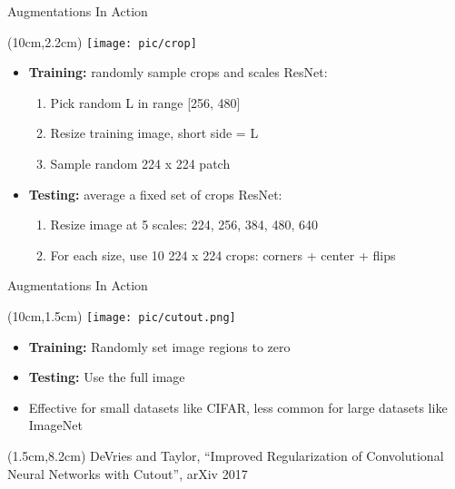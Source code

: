 \documentclass[serif, aspectratio=169]{beamer}
\begin{document}
\begin{frame}{Augmentations In Action}
	\begin{textblock*}{5cm}(10cm,2.2cm) %
		\texttt{[image: pic/crop]}
	\end{textblock*}

	\begin{itemize}
	\item \textbf{Training:} randomly sample crops and scales \newline ResNet:
		\begin{enumerate}
				\item Pick random L in range [256, 480]
				\item Resize training image, short side = L
				\item Sample random 224 x 224 patch
		\end{enumerate}
		
	\item \textbf{Testing:} average a fixed set of crops \newline ResNet:
		\begin{enumerate}
			\item Resize image at 5 scales: {224, 256, 384, 480, 640}
			\item For each size, use 10 224 x 224 crops:  corners + center + flips
		\end{enumerate}				
	\end{itemize}
\end{frame}


\begin{frame}{Augmentations In Action}
	\begin{textblock*}{5cm}(10cm,1.5cm) %
		\texttt{[image: pic/cutout.png]}
	\end{textblock*}

	\begin{itemize}
		\item \textbf{Training:} Randomly set image regions to zero
		\item \textbf{Testing:} Use the full image
		\item Effective for  small datasets like CIFAR, less \newline common for large datasets like ImageNet
	\end{itemize}

	\begin{textblock*}{10cm}(1.5cm,8.2cm) %
		\tiny{DeVries and Taylor, ``Improved Regularization of Convolutional
		Neural Networks with Cutout'', arXiv 2017}
	\end{textblock*}
\end{frame}
\end{document}
